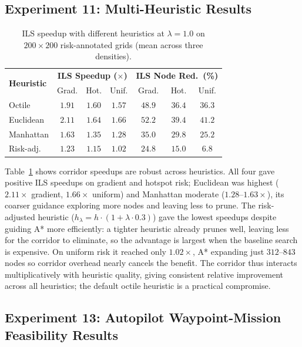 \documentclass[11pt]{article}
\begin{document}
\subsection{Experiment 11: Multi-Heuristic Results}

\begin{table}[!htbp]
\centering
\caption{ILS speedup with different heuristics at $\lambda = 1.0$ on $200 \times 200$ risk-annotated grids (mean across three densities).}
\label{tab:exp11_heuristic}
\begin{tabular}{lcccccc}
\toprule
\multirow{2}{*}{\textbf{Heuristic}} & \multicolumn{3}{c}{\textbf{ILS Speedup ($\times$)}} & \multicolumn{3}{c}{\textbf{ILS Node Red.\ (\%)}} \\
& Grad. & Hot. & Unif. & Grad. & Hot. & Unif. \\
\midrule
Octile         & $1.91$ & $1.60$ & $1.57$ & $48.9$ & $36.4$ & $36.3$ \\
Euclidean      & $2.11$ & $1.64$ & $1.66$ & $52.2$ & $39.4$ & $41.2$ \\
Manhattan      & $1.63$ & $1.35$ & $1.28$ & $35.0$ & $29.8$ & $25.2$ \\
Risk-adj.      & $1.23$ & $1.15$ & $1.02$ & $24.8$ & $15.0$ & $6.8$ \\
\bottomrule
\end{tabular}
\end{table}

Table~\ref{tab:exp11_heuristic} shows corridor speedups are robust across heuristics. All four gave positive ILS speedups on gradient and hotspot risk; Euclidean was highest ($2.11\times$ gradient, $1.66\times$ uniform) and Manhattan moderate ($1.28$--$1.63\times$), its coarser guidance exploring more nodes and leaving less to prune. The risk-adjusted heuristic ($h_\lambda = h \cdot (1 + \lambda \cdot 0.3)$) gave the lowest speedups despite guiding A* more efficiently: a tighter heuristic already prunes well, leaving less for the corridor to eliminate, so the advantage is largest when the baseline search is expensive. On uniform risk it reached only $1.02\times$, A* expanding just $312$--$843$ nodes so corridor overhead nearly cancels the benefit. The corridor thus interacts multiplicatively with heuristic quality, giving consistent relative improvement across all heuristics; the default octile heuristic is a practical compromise.

\subsection{Experiment 13: Autopilot Waypoint-Mission Feasibility Results}\label{subsec:exp13_results}
\end{document}
